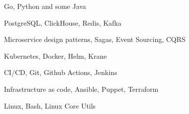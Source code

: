 \item Go, Python and some Java
\item PostgreSQL, ClickHouse, Redis, Kafka
\item Microservice design patterns, Sagas, Event Sourcing, CQRS
\item Kubernetes, Docker, Helm, Krane
\item CI/CD, Git, Github Actions, Jenkins
\item Infrastructure as code, Ansible, Puppet, Terraform
\item Linux, Bash, Linux Core Utils
